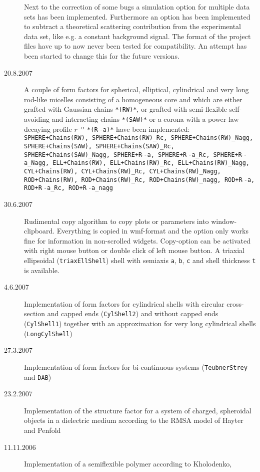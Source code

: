 \begin{description}
    Next to the correction of some bugs a simulation option for
    multiple data sets has been implemented. Furthermore an option has been implemented to subtract a
    theoretical scattering contribution from the experimental data set, like e.g. a constant background signal.
    The format of the project files have up to now never been tested for compatibility. An attempt has
    been started to change this for the future versions.
    \item[20.8.2007] A couple of form factors for spherical, elliptical, cylindrical and very long rod-like
    micelles consisting of a homogeneous core and which are either grafted with Gaussian chains \texttt{*(RW)*},
    or grafted with semi-flexible self-avoiding and interacting chains \texttt{*(SAW)*} or
    a corona with a power-law decaying profile $r^{-\alpha}$ \texttt{*(R$\hat{~}$-a)*}
    have been implemented:
    \texttt{
    SPHERE+Chains(RW), SPHERE+Chains(RW)\_Rc, SPHERE+Chains(RW)\_Nagg,
    SPHERE+Chains(SAW), SPHERE+Chains(SAW)\_Rc, SPHERE+Chains(SAW)\_Nagg,
    SPHERE+R$\hat{~}$-a, SPHERE+R$\hat{~}$-a\_Rc, SPHERE+R$\hat{~}$-a\_Nagg,
    ELL+Chains(RW), ELL+Chains(RW)\_Rc, ELL+Chains(RW)\_Nagg,
    CYL+Chains(RW), CYL+Chains(RW)\_Rc, CYL+Chains(RW)\_Nagg,
    ROD+Chains(RW), ROD+Chains(RW)\_Rc, ROD+Chains(RW)\_nagg,
    ROD+R$\hat{~}$-a, ROD+R$\hat{~}$-a\_Rc, ROD+R$\hat{~}$-a\_nagg
    }
    \item[30.6.2007] Rudimental copy algorithm to copy plots or parameters into window-clipboard. Everything
    is copied in wmf-format and the option only works fine for information in non-scrolled widgets.
    Copy-option can be activated with right mouse button or double click of left mouse button.
    A triaxial ellipsoidal (\texttt{triaxEllShell}) shell with semiaxis \texttt{a}, \texttt{b}, \texttt{c}
    and shell thickness \texttt{t} is available.
    \item[4.6.2007] Implementation of form factors for cylindrical shells with circular cross-section and capped ends
    (\texttt{CylShell2}) and without capped ends (\texttt{CylShell1}) together with an approximation for very long
    cylindrical shells (\texttt{LongCylShell})
    \item[27.3.2007] Implementation of form factors for bi-continuous systems (\texttt{TeubnerStrey} and \texttt{DAB})
    \item[23.2.2007] Implementation of the structure factor for a system of charged, spheroidal objects in a
    dielectric medium according to the RMSA model of Hayter and Penfold
    \item[11.11.2006]  Implementation of a semiflexible polymer according to Kholodenko,

\end{description}
